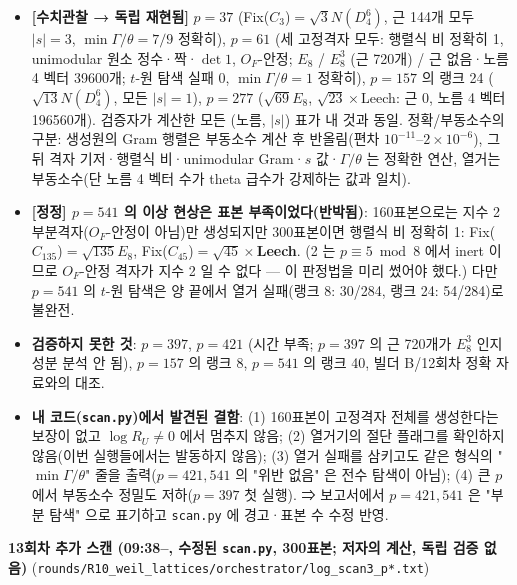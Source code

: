 \begin{itemize}
\tightlist
\item
  \textbf{{[}수치관찰 → 독립 재현됨{]}} \(p=37\) (Fix(\(C_3\))\(=\sqrt3N(D_4^6)\), 근 144개 모두 \(|s|=3\), \(\min\Gamma/\theta=7/9\) 정확히), \(p=61\) (세 고정격자 모두: 행렬식 비 정확히 1, unimodular 원소 정수·짝·\(\det1\), \(O_F\)-안정; \(E_8\) / \(E_8^3\) (근 720개) / 근 없음·노름 4 벡터 39600개; \(t\)-원 탐색 실패 0, \(\min\Gamma/\theta=1\) 정확히), \(p=157\) 의 랭크 24 (\(\sqrt{13}N(D_4^6)\), 모든 \(|s|=1\)), \(p=277\) (\(\sqrt{69}E_8\), \(\sqrt{23}\times\)Leech: 근 0, 노름 4 벡터 196560개). 검증자가 계산한 모든 (노름, \(|s|\)) 표가 내 것과 동일. 정확/부동소수의 구분: 생성원의 Gram 행렬은 부동소수 계산 후 반올림(편차 \(10^{-11}\)--\(2\times10^{-6}\)), 그 뒤 격자 기저·행렬식 비·unimodular Gram·\(s\) 값·\(\Gamma/\theta\) 는 정확한 연산, 열거는 부동소수(단 노름 4 벡터 수가 theta 급수가 강제하는 값과 일치).
\item
  \textbf{{[}정정{]} \(p=541\) 의 이상 현상은 표본 부족이었다(반박됨)}: 160표본으로는 지수 2 부분격자(\(O_F\)-안정이 아님)만 생성되지만 300표본이면 행렬식 비 정확히 1: Fix(\(C_{135}\))\(=\sqrt{135}E_8\), Fix(\(C_{45}\))\(=\sqrt{45}\times\)\textbf{Leech}. (2 는 \(p\equiv5\bmod8\) 에서 inert 이므로 \(O_F\)-안정 격자가 지수 2 일 수 없다 --- 이 판정법을 미리 썼어야 했다.) 다만 \(p=541\) 의 \(t\)-원 탐색은 양 끝에서 열거 실패(랭크 8: 30/284, 랭크 24: 54/284)로 불완전.
\item
  \textbf{검증하지 못한 것}: \(p=397\), \(p=421\) (시간 부족; \(p=397\) 의 근 720개가 \(E_8^3\) 인지 성분 분석 안 됨), \(p=157\) 의 랭크 8, \(p=541\) 의 랭크 40, 빌더 B/12회차 정확 자료와의 대조.
\item
  \textbf{내 코드(\texttt{scan.py})에서 발견된 결함}: (1) 160표본이 고정격자 전체를 생성한다는 보장이 없고 \(\log R_U\ne0\) 에서 멈추지 않음; (2) 열거기의 절단 플래그를 확인하지 않음(이번 실행들에서는 발동하지 않음); (3) 열거 실패를 삼키고도 같은 형식의 "\(\min\Gamma/\theta\)" 줄을 출력(\(p=421,541\) 의 "위반 없음" 은 전수 탐색이 아님); (4) 큰 \(p\) 에서 부동소수 정밀도 저하(\(p=397\) 첫 실행). ⇒ 보고서에서 \(p=421,541\) 은 "부분 탐색" 으로 표기하고 \texttt{scan.py} 에 경고·표본 수 수정 반영.
\end{itemize}

\textbf{13회차 추가 스캔 (09:38--, 수정된 \texttt{scan.py}, 300표본; 저자의 계산, 독립 검증 없음)} (\texttt{rounds/R10\_weil\_lattices/orchestrator/log\_scan3\_p*.txt})

